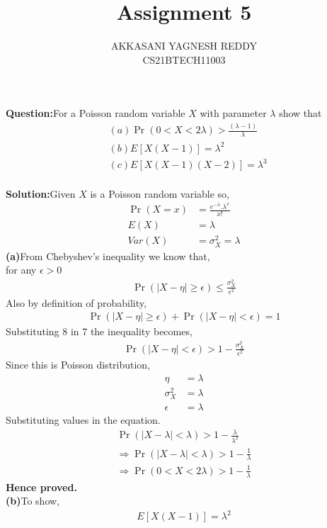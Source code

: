 \documentclass[journal,12pt,twocolumn]{IEEEtran}
\title{Assignment 5}
\author{AKKASANI YAGNESH REDDY \\
     CS21BTECH11003 \\}
\providecommand{\pr}[1]{\ensuremath{\Pr\left(#1\right)}}
\begin{document}
     \maketitle
     \textbf{Question:}For a Poisson random variable $X$ with parameter $\lambda$ show that \\
     \begin{align}
    &(a)\pr{0<X<2\lambda} > \frac{(\lambda-1)}{\lambda}\\
    &(b)E[X(X-1)]=\lambda^{2}\\
    &(c)E[X(X-1)(X-2)]=\lambda^{3}
    \end{align}\\
     \textbf{Solution:}Given $X$ is a Poisson  random variable so,
     \begin{align}
\pr{X=x}&=\frac{e^{-\lambda}.\lambda^{x}}{x!}\\
         E(X)&=\lambda\\
         Var(X)&=\sigma_{X}^{2}=\lambda
     \end{align}
\textbf{(a)}From Chebyshev's inequality we know that,\\
for any $\epsilon>0$
\begin{align}
\pr{|X-\eta|\geq\epsilon}\leq\frac{\sigma_{X}^{2}}{\epsilon^{2}}
\end{align}
Also by definition of probability,
\begin{align}
    \pr{|X-\eta|\geq\epsilon}+\pr{|X-\eta|<\epsilon}=1
    \end{align}
    Substituting 8 in 7 the inequality becomes,
    \begin{align}
        \pr{|X-\eta|<\epsilon}>1-\frac{\sigma_{X}^{2}}{\epsilon^{2}}
    \end{align}
  Since this is Poisson distribution,
    \begin{align}
  \eta&=\lambda\\
  \sigma_{X}^{2}&=\lambda\\
  \epsilon&=\lambda
    \end{align}
    Substituting values in the equation.
    \begin{align}
    \pr{|X-\lambda|<\lambda}>1-\frac{\lambda}{\lambda^{2}}\\
    \Rightarrow\pr{|X-\lambda|<\lambda}>1-\frac{1}{\lambda}\\
        \Rightarrow\pr{0<X<2\lambda}>1-\frac{1}{\lambda}
    \end{align}
    \textbf{Hence proved.}\\\newpage
\textbf{(b)}To show,
\begin{align}
E[X(X-1)]=\lambda^{2}
\end{align}
\end{document}
